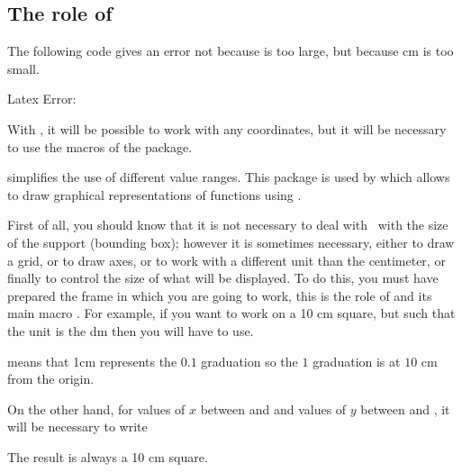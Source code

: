 \subsection{The role of \tkzname{\tkznameofpack}}
The following code gives an error not because  is too large, but because  cm is too small.

 {\color{red} Latex Error:}

\begin{tkzltxexample}[right margin=7cm]  
\end{tkzltxexample}

With , it will be possible to work with any coordinates, but it will be necessary to use the macros of the package.

 simplifies the use of different value ranges. This package is used by   which allows to draw graphical representations of functions using .

First of all, you should know that it is not necessary to deal with \TIKZ\ with the size of the support (bounding box); however it is sometimes necessary, either to draw a grid, or to draw axes, or to work with a different unit than the centimeter, or finally to control the size of what will be displayed.
 To do this, you must have prepared the frame in which you are going to work, this is the role of  and its main macro . For example, if you want to work on a 10 cm square, but such that the unit is the dm then you will have to use.

\begin{tkzltxexample}[right margin=7cm]   
\tkzInit[xmax=1,ymax=1,xstep=0.1,ystep=0.1]
\end{tkzltxexample}

 means that 1cm represents the $0.1$ graduation so the $1$ graduation is at $10$ cm from the origin.

On the other hand, for values of $x$ between  and  and values of $y$ between  and , it will be necessary to write 

\begin{tkzltxexample}[right margin=6cm]     
\tkzInit[xmax=10000,ymax=100000,xstep=1000,ystep=10000]
\end{tkzltxexample}
The result is always a 10 cm square.

